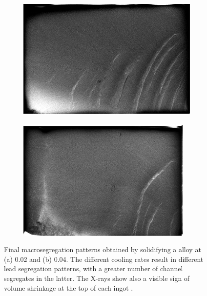 %
\begin{figure}[htbp]
\centering
  \begin{subfigure}[t]{0.45\textwidth}
    \centering
	\includegraphics[width=\textwidth]{Chapter5/Graphics/2d/Hachani0p02.png}
	\caption{}
    \label{fig:smacs_lowcr}
  \end{subfigure}
  \hfill
  \begin{subfigure}[t]{0.45\textwidth}
    \centering
	\includegraphics[width=\textwidth]{Chapter5/Graphics/2d/Hachani0p04.png}
	\caption{}
    \label{fig:smacs_highcr}
  \end{subfigure}
\caption{Final macrosegregation patterns obtained by solidifying a  alloy at (a) \SI{0.02}{\uCR} and (b) \SI{0.04}{\uCR}. 
The different cooling rates result in different lead segregation patterns, with a greater number of channel segregates in the latter.
The X-rays show also a visible sign of volume shrinkage at the top of each ingot \citep{hachani_experimental_2012}.}
\label{fig:smacs_exp}
\end{figure}


